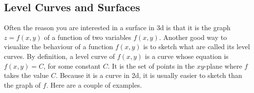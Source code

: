 \subsection{Level Curves and Surfaces}

Often the reason you are interested in a surface in 3d is that it is
the graph $z=f(x,y)$ of a function of two variables $f(x,y)$. Another good
way to visualize the behaviour of a function $f(x,y)$ is to sketch what
are called its level curves. By definition, a level curve of $f(x,y)$
is a curve whose equation is $f(x,y)=C$, for some constant $C$. It is the
set of points in the $xy$-plane where $f$ takes the value $C$. Because
it is a curve in 2d, it is usually easier to sketch than the graph of $f$.
Here are a couple of examples. 

